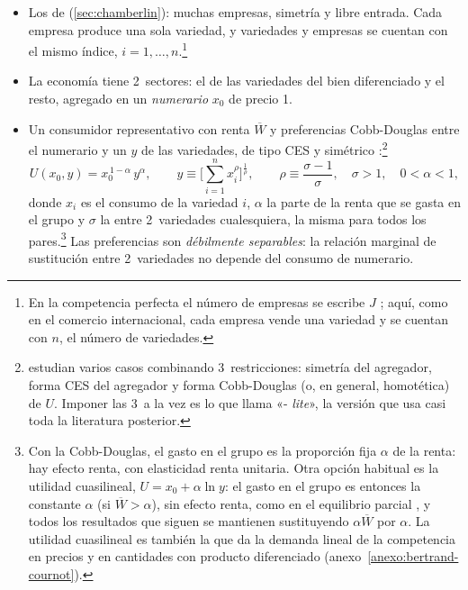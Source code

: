 \documentclass[11pt]{article}
\begin{document}
\begin{itemize}
\item Los de  (\ref{sec:chamberlin}): muchas empresas, simetría y libre entrada. Cada empresa produce una sola variedad, y variedades y empresas se cuentan con el mismo índice, $i=1,\dots,n$.\footnote{En la competencia perfecta el número de empresas se escribe $J$ ; aquí, como en el comercio internacional, cada empresa vende una variedad y se cuentan con $n$, el número de variedades.}
\item La economía tiene 2~sectores: el de las variedades del bien diferenciado y el resto, agregado en un \emph{numerario} $x_0$ de precio 1.
\item Un consumidor representativo con renta $\overline{W}$ y preferencias Cobb-Douglas entre el numerario y un  $y$ de las variedades, de tipo CES y simétrico :\footnote{\textcite{DixitStiglitz1977Monopolistic} estudian varios casos combinando 3~restricciones: simetría del agregador, forma CES del agregador y forma Cobb-Douglas (o, en general, homotética) de $U$. Imponer las 3~a la vez es lo que \textcite{Neary2004Monopolistic} llama «- \emph{lite}», la versión que usa casi toda la literatura posterior.}
  \begin{equation}\label{eq:utilidad-ds}
  U(x_0,y)=x_0^{\,1-\alpha}\,y^{\alpha},\qquad y\equiv\Big[\sum_{i=1}^{n}x_i^{\rho}\Big]^{\frac{1}{\rho}},\qquad \rho\equiv\frac{\sigma-1}{\sigma},\quad \sigma>1,\quad 0<\alpha<1,
  \end{equation}
  donde $x_i$ es el consumo de la variedad $i$, $\alpha$ la parte de la renta que se gasta en el grupo y $\sigma$ la  entre 2~variedades cualesquiera, la misma para todos los pares.\footnote{Con la Cobb-Douglas, el gasto en el grupo es la proporción fija $\alpha$ de la renta: hay efecto renta, con elasticidad renta unitaria. Otra opción habitual es la utilidad cuasilineal, $U=x_0+\alpha\ln y$: el gasto en el grupo es entonces la constante $\alpha$ (si $\overline{W}>\alpha$), sin efecto renta, como en el equilibrio parcial , y todos los resultados que siguen se mantienen sustituyendo $\alpha\overline{W}$ por $\alpha$. La utilidad cuasilineal es también la que da la demanda lineal de la competencia en precios y en cantidades con producto diferenciado (anexo~\ref{anexo:bertrand-cournot}).} Las preferencias son \emph{débilmente separables}: la relación marginal de sustitución entre 2~variedades no depende del consumo de numerario.

\end{itemize}
\end{document}
